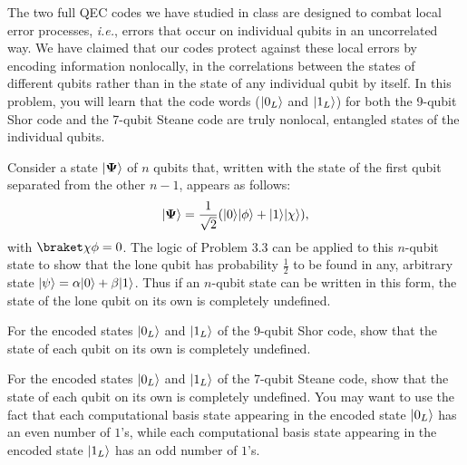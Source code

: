 \documentclass{../phys084}
\begin{document}
\begin{exercise}
  The two full QEC codes we have studied in class are designed to
  combat local error processes, \textit{i.e.}, errors that occur on
  individual qubits in an uncorrelated way.  We have claimed that our
  codes protect against these local errors by encoding information
  nonlocally, in the correlations between the states of different
  qubits rather than in the state of any individual qubit by itself.
  In this problem, you will learn that the code words (\(\lvert0_L\rangle\)
  and \(\lvert1_L\rangle\)) for both the 9-qubit Shor code and the 7-qubit
  Steane code are truly nonlocal, entangled states of the individual
  qubits.

  Consider a state \(\lvert\mathbf \Psi\rangle\) of \(n\) qubits that,
  written with the state of the first qubit separated from the other
  \(n-1\), appears as follows:
  \[
    \ket{\mathbf \Psi} =
    \frac{1}{\sqrt 2} \prn*{\ket 0 \ket \phi + \ket 1 \ket \chi},
  \]
  with \(\braket \chi \phi = 0\).  The logic of Problem 3.3 can be
  applied to this \(n\)-qubit state to show that the lone qubit has
  probability \(\frac 1 2\) to be found in any, arbitrary state
  \(\lvert\psi\rangle = \alpha \lvert0\rangle + \beta \lvert1\rangle\).  Thus if an
  \(n\)-qubit state can be written in this form, the state of the lone
  qubit on its own is completely undefined.
  \begin{problems}
  \item For the encoded states \(\lvert0_L\rangle\) and \(\lvert1_L\rangle\) of the
    9-qubit Shor code, show that the state of each qubit on its own is
    completely undefined.
  \item For the encoded states \(\lvert0_L\rangle\) and \(\lvert1_L\rangle\) of the
    7-qubit Steane code, show that the state of each qubit on its own
    is completely undefined.  You may want to use the fact that each
    computational basis state appearing in the encoded state
    \(\lvert0_L\rangle\) has an even number of \(1\)'s, while each
    computational basis state appearing in the encoded state
    \(\lvert1_L\rangle\) has an odd number of \(1\)'s.
  \end{problems}
\end{exercise}

\begin{solution}

\end{solution}
\end{document}
